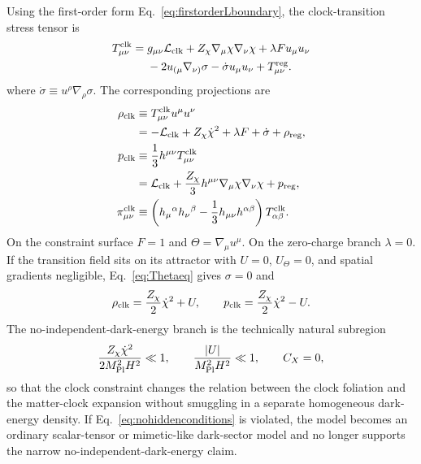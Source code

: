 \documentclass[aps,prd,reprint,nofootinbib,superscriptaddress,longbibliography]{revtex4-2}
\newcommand{\mpl}{M_{\rm Pl}}
\begin{document}
Using the first-order form Eq.~\eqref{eq:firstorderLboundary}, the clock-transition stress tensor is
\begin{align}
  T^{\rm clk}_{\mu\nu}={}&g_{\mu\nu}{\cal L}_{\rm clk}
  +Z_\chi\nabla_\mu\chi\nabla_\nu\chi+\lambda F u_\mu u_\nu\nonumber\\
  &-2u_{(\mu}\nabla_{\nu)}\sigma-\dot\sigma u_\mu u_\nu
  +T^{\rm reg}_{\mu\nu} .
  \label{eq:clockstress_explicit}
\end{align}
where $\dot\sigma\equiv u^\rho\nabla_\rho\sigma$.  The corresponding projections are
\begin{align}
  \rho_{\rm clk}&\equiv T^{\rm clk}_{\mu\nu}u^\mu u^\nu\nonumber\\
  &=-{\cal L}_{\rm clk}+Z_\chi\dot\chi^2+\lambda F+\dot\sigma+\rho_{\rm reg},\label{eq:rho_clock_general}\\
  p_{\rm clk}&\equiv \frac13h^{\mu\nu}T^{\rm clk}_{\mu\nu}\nonumber\\
  &={\cal L}_{\rm clk}+\frac{Z_\chi}{3}h^{\mu\nu}\nabla_\mu\chi\nabla_\nu\chi+p_{\rm reg},\label{eq:p_clock_general}\\
  \pi^{\rm clk}_{\mu\nu}&\equiv
  \left(h_\mu{}^\alpha h_\nu{}^\beta-\frac13h_{\mu\nu}h^{\alpha\beta}\right)T^{\rm clk}_{\alpha\beta} .\nonumber
\end{align}
On the constraint surface $F=1$ and $\Theta=\nabla_\mu u^\mu$.  On the zero-charge branch $\lambda=0$.  If the transition field sits on its attractor with $U=0$, $U_\Theta=0$, and spatial gradients negligible, Eq.~\eqref{eq:Thetaeq} gives $\sigma=0$ and
\begin{equation}
  \rho_{\rm clk}=\frac{Z_\chi}{2}\dot\chi^2+U,
  \qquad
  p_{\rm clk}=\frac{Z_\chi}{2}\dot\chi^2-U.
  \label{eq:rho_p_chi_only}
\end{equation}
The no-independent-dark-energy branch is the technically natural subregion
\begin{equation}
  \frac{Z_\chi\dot\chi^2}{2\mpl^2H^2}\ll1,
  \qquad
  \frac{|U|}{\mpl^2H^2}\ll1,
  \qquad
  C_X=0,
  \label{eq:nohiddenconditions}
\end{equation}
so that the clock constraint changes the relation between the clock foliation and the matter-clock expansion without smuggling in a separate homogeneous dark-energy density.  If Eq.~\eqref{eq:nohiddenconditions} is violated, the model becomes an ordinary scalar-tensor or mimetic-like dark-sector model and no longer supports the narrow no-independent-dark-energy claim.
\end{document}

